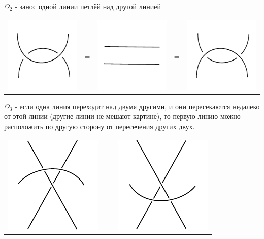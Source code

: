 $\Omega_2$ - занос одной линии петлёй над другой линией

\begin{tabular}{
>{\centering\arraybackslash}m{3cm}>{\centering\arraybackslash}m{0.4cm}
>{\centering\arraybackslash}m{3cm}>{\centering\arraybackslash}m{0.4cm}
>{\centering\arraybackslash}m{3cm}
}
\includegraphics{images/two-loops-up.pdf}
&
=
&
\includegraphics{images/two-line.pdf}
&
=
&
\includegraphics{images/two-loops-down.pdf}
\end{tabular}


$\Omega_3$ - если одна линия переходит над двумя другими, и они пересекаются недалеко от этой линии (другие линии не мешают картине), то первую линию можно расположить по другую сторону от пересечения других двух.

\begin{tabular}{
>{\centering\arraybackslash}m{3cm}>{\centering\arraybackslash}m{0.4cm}
>{\centering\arraybackslash}m{3cm}
}
\includegraphics{images/over-cross-top.pdf}
&
=
&
\includegraphics{images/over-cross-bottom.pdf}

\end{tabular}
